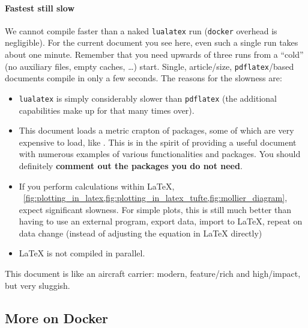 \paragraph{Fastest still slow}
We cannot compile faster than a naked \texttt{lualatex} run (\texttt{docker} overhead is negligible).
For the current document you see here, even such a single run takes about one minute.
Remember that you need upwards of three runs from a \enquote{cold} (no auxiliary files, empty caches, \dots{}) start.
Single, article\-/size, \texttt{pdflatex}\-/based documents compile in only a few seconds.
The reasons for the slowness are:
\begin{itemize}
    \item \texttt{lualatex} is simply considerably slower than \texttt{pdflatex}
        (the additional capabilities make up for that many times over).
    \item This document loads a metric crapton of packages, some of which are very expensive to load, like .
        This is in the spirit of providing a useful document with numerous examples of various functionalities and packages.
        You should definitely \textbf{\textcolor{mRed}{comment out the packages you do not need}}.
    \item If you perform  calculations within \LaTeX{}, \ \cref{fig:plotting_in_latex,fig:plotting_in_latex_tufte,fig:mollier_diagram}, expect significant slowness.
        For simple plots, this is still much better than having to use an external program, export data, import to \LaTeX{}, repeat on data change (instead of adjusting the equation in \LaTeX{} directly) 
    \item \LaTeX{} is not compiled in parallel.
\end{itemize}
This document is like an aircraft carrier: modern, feature\-/rich and high\-/impact, but very sluggish.

\subsection{More on Docker}

